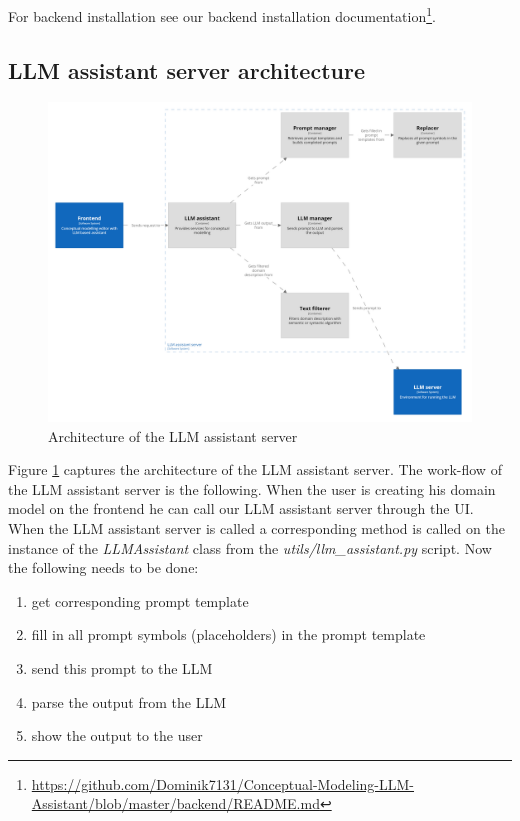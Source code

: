 For backend installation see our backend installation documentation\footnote{\url{https://github.com/Dominik7131/Conceptual-Modeling-LLM-Assistant/blob/master/backend/README.md}}.


\subsection{LLM assistant server architecture}

\begin{figure}[!h]
    \includegraphics[scale=0.14]{../docs/images/architecture/llm-assistant-server-containers.png}
    \caption{\centering Architecture of the LLM assistant server}
    \label{fig:llm_assistant_server_containers}
\end{figure}

Figure \ref{fig:llm_assistant_server_containers} captures the architecture of the LLM assistant server. The work-flow of the LLM assistant server is the following. When the user is creating his domain model on the frontend he can call our LLM assistant server through the UI. When the LLM assistant server is called a corresponding method is called on the instance of the \textit{LLMAssistant} class from the \textit{utils/llm\_assistant.py} script. Now the following needs to be done:

\begin{enumerate}
\item get corresponding prompt template
\item fill in all prompt symbols (placeholders) in the prompt template
\item send this prompt to the LLM
\item parse the output from the LLM
\item show the output to the user
\end{enumerate}

